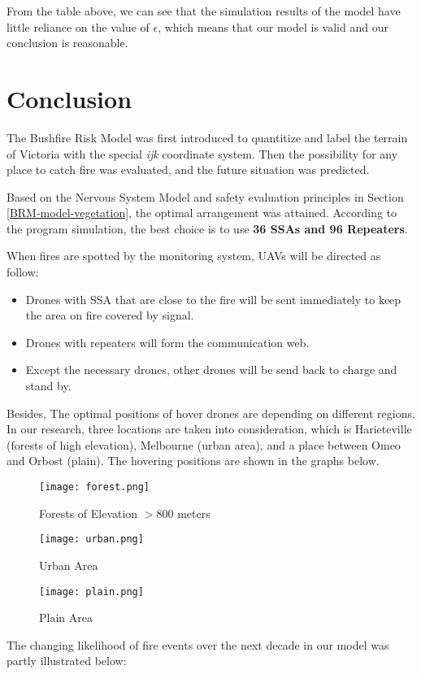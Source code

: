 \documentclass[13pt]{ctexart} %
\begin{document}
From the table above, we can see that the simulation results of the model have little reliance on the value of $\epsilon$, which means that our model is valid and our conclusion is reasonable.

\section{Conclusion}
The Bushfire Risk Model was first introduced to quantitize and label the terrain of Victoria with the special \textit{ijk} coordinate system. Then the possibility for any place to catch fire was evaluated, and the future situation was predicted.

Based on the Nervous System Model and safety evaluation principles in Section \ref{BRM-model-vegetation}, the optimal arrangement was attained. According to the program simulation, the best choice is to use \textbf{36 SSAs and 96 Repeaters}.

When fires are spotted by the monitoring system, UAVs will be directed as follow:
\begin{itemize}
    \item Drones with SSA that are close to the fire will be sent immediately to keep the area on fire covered by signal.
    \item Drones with repeaters will form the communication web.
    \item Except the necessary drones, other drones will be send back to charge and stand by.
\end{itemize}

Besides, The optimal positions of hover drones are depending on different regions. In our research, three locations are taken into consideration, which is Harieteville (forests of high elevation), Melbourne (urban area), and a place between Omeo and Orbost (plain). The hovering positions are shown in the graphs below.
\begin {figure}[h]
\centering %
\texttt{[image: forest.png]}
\caption{Forests of Elevation $> 800$ meters} %
\end {figure}

\begin {figure}[h]
\centering %
\texttt{[image: urban.png]}
\caption{Urban Area} %
\end {figure}

\begin {figure}[h]
\centering %
\texttt{[image: plain.png]}
\caption{Plain Area} %
\end {figure}
\FloatBarrier
The changing likelihood of fire events over the next decade in our model was partly illustrated below:
\end{document}
